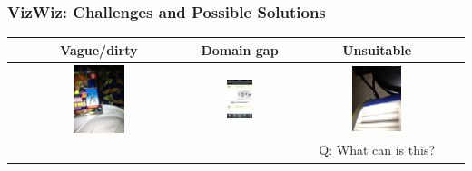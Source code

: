 \documentclass{beamer}
\begin{document}
\begin{frame}
    \frametitle{VizWiz: Challenges and Possible Solutions}

    \begin{table}
        \begin{tabular}{c | c | c}
        Vague/dirty & Domain gap & Unsuitable\\
        \hline \hline
        \includegraphics[width=0.3\textwidth]{img/vw_vague.jpg} & 
        \includegraphics[width=0.3\textwidth]{img/vw_gap.jpg} &
        \includegraphics[width=0.3\textwidth]{img/vw_unans.jpg}

        \\
        & 
        & Q: What can is this?
        \end{tabular}
        
    \end{table}




\end{frame}
\end{document}
